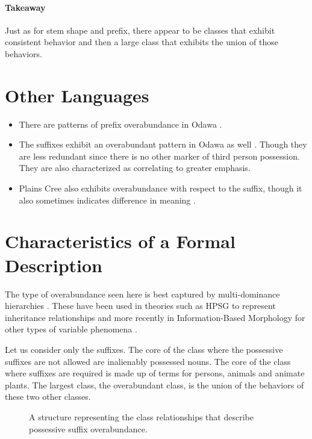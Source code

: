 \paragraph{Takeaway} Just as for stem shape and prefix, there appear
to be classes that exhibit consistent behavior and then a large class
that exhibits the union of those behaviors.

\section{Other Languages}

\begin{itemize}
\item There are patterns of prefix overabundance in Odawa
  \citep{odawagrammar}.
\item The suffixes exhibit an overabundant pattern in Odawa as well
  \citep{odawagrammar}. Though they are less redundant since there is
  no other marker of third person possession. They are also
  characterized as correlating to greater emphasis.
\item Plains Cree also exhibits overabundance with respect to the
  suffix, though it also sometimes indicates difference in meaning
  \citep{ahenakew1987cree}.
\end{itemize}

\section{Characteristics of a Formal Description}

The type of overabundance seen here is best captured by
multi-dominance hierarchies \citep{naranjo2016overabundance}. These
have been used in theories such as HPSG to represent inheritance
relationships \citep{flickinger1985structure, flickinger1987lexical,
  sag1987information} and more recently in Information-Based
Morphology for other types of variable phenomena
\citep{crysmann2012establishing, crysmann2016variable}.

Let us consider only the suffixes. The core of the class where the
possessive suffixes are not allowed are inalienably possessed
nouns. The core of the class where suffixes are required is made up of
terms for persons, animals and animate plants. The largest class, the
overabundant class, is the union of the behaviors of these two other
classes.

\begin{figure}[H]
  \centering
  
  \caption{A structure representing the class relationships that
    describe possessive suffix overabundance.}
  \label{dpoles}
\end{figure}

